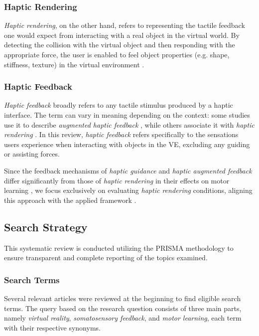\subsubsection{Haptic Rendering}
\textit{Haptic rendering}, on the other hand, refers to representing the tactile feedback one would expect from interacting with a real object in the virtual world. By detecting the collision with the virtual object and then responding with the appropriate force, the user is enabled to feel object properties (e.g. shape, stiffness, texture) in the virtual environment \cite{Basdogan2002HapticEnvironments, Salisbury1997Phantom-basedObjects}. 

\subsubsection{Haptic Feedback}
\textit{Haptic feedback} broadly refers to any tactile stimulus produced by a haptic interface. The term can vary in meaning depending on the context: some studies use it to describe \textit{augmented haptic feedback} \cite{Gambaro2014}, while others associate it with \textit{haptic rendering} \cite{Caccianiga2021}. In this review, \textit{haptic feedback} refers specifically to the sensations users experience when interacting with objects in the VE, excluding any guiding or assisting forces.\newline

Since the feedback mechanisms of \textit{haptic guidance} and \textit{haptic augmented feedback} differ significantly from those of \textit{haptic rendering} in their effects on motor learning \cite{Sigrist2013AugmentedReview}, we focus exclusively on evaluating \textit{haptic rendering} conditions, aligning this approach with the applied framework \cite{Muender2022HapticReality}. 

\subsection{Search Strategy}

This systematic review is conducted utilizing the PRISMA methodology \cite{Page2021TheReviews} to ensure transparent and complete reporting of the topics examined.

\subsubsection{Search Terms}
Several relevant articles were reviewed at the beginning to find eligible search terms. The query based on the research question consists of three main parts, namely \textit{virtual reality}, \textit{somatosensory feedback}, and \textit{motor learning}, each term with their respective synonyms. 

